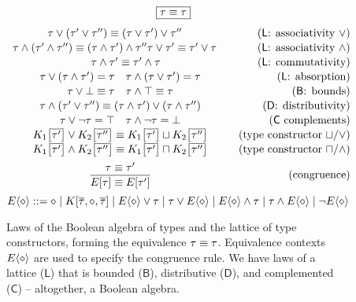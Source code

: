 \begin{figure}
    \centering
    $$ \boxed{\tau \equiv \tau} $$
    $$ \renewcommand\arraystretch{1.1} \begin{array}{cr}
    \tau \join (\tau' \join \tau'') \typeq (\tau \join \tau') \join \tau'' \quad 
    & \text{($\mathsf L$: associativity \mbox{$\join$})}
    \\
    \tau \meet (\tau' \meet \tau'') \typeq (\tau \meet \tau') \meet \tau''
    \tau \join \tau' \typeq \tau' \join \tau  \quad 
    & \text{($\mathsf L$: associativity \mbox{$\meet$})} 
    \\
    \quad
    \tau \meet \tau' \typeq \tau' \meet \tau 
    & \text{($\mathsf L$: commutativity)}
    \\
    \tau \join (\tau \meet \tau') = \tau
    \quad 
    \tau \meet (\tau \join \tau') = \tau
    & \text{($\mathsf L$: absorption)}
    \\ 
    \tau \join \bot \typeq \tau
    \quad 
    \tau \meet \top \typeq \tau 
    & \text{($\mathsf B$: bounds)} 
    \\
    \tau \meet (\tau' \join \tau'') \typeq (\tau \meet \tau') \join (\tau \meet \tau'')
    & \text{($\mathsf D$: distributivity)}
    \\
    \tau \join \comp \tau = \top 
    \quad
    \tau \meet \comp \tau = \bot
    & \text{($\mathsf C$ complements)} 
    \\ 
    \constr_1\left[\overline {\tau'}\right] \join \constr_2\left[\overline {\tau''}\right] \typeq \constr_1\left[\overline {\tau'}\right] \cjoin \constr_2\left[\overline {\tau''}\right]
    & \text{(type constructor $\cjoin$/$\join$)}
    \\
    \constr_1\left[\overline {\tau'}\right] \meet \constr_2\left[\overline {\tau''}\right] \typeq \constr_1\left[\overline {\tau'}\right] \cmeet \constr_2\left[\overline {\tau''}\right]
    & \text{(type constructor $\cmeet$/$\meet$)}
    \\[0.5em] 
    \dfrac{\tau \typeq \tau'}{E[\tau] \typeq E[\tau']} 
    & \text{(congruence)}
    \end{array} $$
    $$ \equivctx ::= \ctxhole \mid \constr[\overline \tau, \ctxhole, \overline \tau] \mid \equivctx \join \tau \mid \tau \join \equivctx \mid \equivctx \meet \tau \mid \tau \meet \equivctx \mid \comp \equivctx $$
    \caption{Laws of the Boolean algebra of types and the lattice of type constructors, forming the equivalence $\tau \equiv \tau$. Equivalence contexts $\equivctx$ are used to specify the congruence rule. We have laws of a lattice ($\mathsf L$) that is bounded ($\mathsf B$), distributive ($\mathsf D$), and complemented ($\mathsf C$) -- altogether, a Boolean algebra.}
    \label{fig:boolean-laws}
\end{figure}

